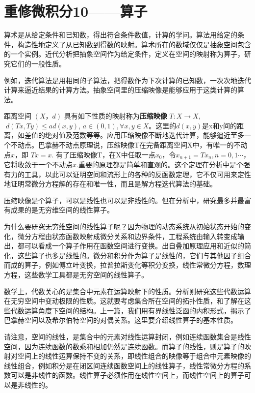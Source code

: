 \section{重修微积分10——算子}

算术是从给定条件和已知数，得出符合条件数值，计算的学问。算法用给定的条件，构造性地定义了从已知数到得数的映射。算术所在的数域仅仅是抽象空间包含的一个实例。近代分析把抽象空间作为给定条件，定义在空间的映射称为算子，研究它们的一般性质。

例如，迭代算法是用相同的子算法，把得数作为下次计算的已知数，一次次地迭代计算来逼近结果的计算方法。抽象空间里的压缩映像是能够应用于这类计算的算法。

距离空间 $ (X，d) $ 具有如下性质的映射称为\textbf{压缩映像} $ T: X \rightarrow X, \;$  $\; d(Tx, Ty)\leq ad(x,y) $,  $ a\in(0,1),\forall x,y \in X $。这里的$ d(x,y) $是x和y间的距离，如差值的绝对值及范数等等。应用压缩映像不断地迭代计算，能够逼近至多一个不动点。巴拿赫不动点原理说，压缩映像T在完备距离空间X中，有唯一的不动点$ x $，即 $  Tx = x $. 有了压缩映像T，在X中任取一点$ x_0 $，令$ x_{n+1} =Tx_n, n=0,1\cdots $，它将收敛于一个不动点$ x $.重要的原理都是简单和直观的。这个定理在分析中是个强有力的工具，以此可以证明空间和流形上的各种的反函数定理，它不仅可用来定性地证明常微分方程解的存在和唯一性，而且是解方程迭代算法的基础。

压缩映像是个算子，可以是线性也可以是非线性的。但在分析中，研究最多并最富有成果的是无穷维空间的线性算子。

为什么要研究无穷维空间的线性算子呢？因为物理的动态系统从初始状态开始的变化，微分方程由状态函数映射成微分关系和边界条件，工程系统由输入转变成输出，都可以看成一个算子作用在函数空间进行变换。出自叠加原理应用和近似的简化，这些算子也多是线性的。微分和积分作为算子是线性的，它们与其他因子组合而成的算子，例如傅立叶变换，拉普拉斯变化等积分变换，线性常微分方程，数理方程，这些数学工具都是无穷空间的线性算子。

数学上，代数关心的是集合中元素在运算映射下的性质。分析则研究这些代数运算在无穷空间中变动极限的性质。这就要考虑集合所在空间的拓扑性质，和了解在这些代数运算角度下空间的结构。上一篇，我们用有界线性泛函的内积形式，揭示了巴拿赫空间以及希尔伯特空间的对偶关系。这里要介绍线性算子的基本性质。

请注意，空间的线性，是集合中的元素对线性运算封闭，例如连续函数集合是线性空间，因为连续函数的数乘和相加仍然是连续函数。而算子的线性，则是算子的映射对空间上的线性运算保持不变的关系，即线性组合的映像等于组合中元素映像的线性组合，例如积分是在闭区间连续函数空间上的线性算子，线性常微分方程的系数可以是非线性的函数。线性算子必须作用在线性空间上，而线性空间上的算子可以是非线性的。

